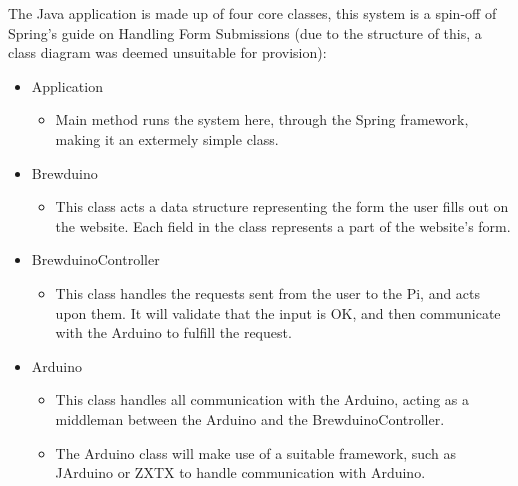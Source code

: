 \documentclass[12pt, a4paper]{article}
\begin{document}
The Java application is made up of four core classes, this system is a spin-off
of Spring's guide on Handling Form Submissions\cite{SpringGuide} (due to the
structure of this, a class diagram was deemed unsuitable for provision):
\begin{itemize}
	\item Application
	\begin{itemize}
		\item Main method runs the system here, through the Spring framework,
		making it an extermely simple class.
	\end{itemize}
	\item Brewduino
	\begin{itemize}
		\item This class acts a data structure representing the form the user
		fills out on the website. Each field in the class represents a part of
		the website's form.
	\end{itemize}
	\item BrewduinoController
	\begin{itemize}
		\item This class handles the requests sent from the user to the Pi, and
		acts upon them. It will validate that the input is OK, and then
		communicate with the Arduino to fulfill the request.
	\end{itemize}
	\item Arduino
	\begin{itemize}
		\item This class handles all communication with the Arduino, acting as a
		middleman between the Arduino and the BrewduinoController.
		\item The Arduino class will make use of a suitable framework, such as
		JArduino\cite{JArduino} or ZXTX\cite{RXTX} to handle communication with Arduino.
	\end{itemize}
\end{itemize}
\newpage


 
\end{document}
